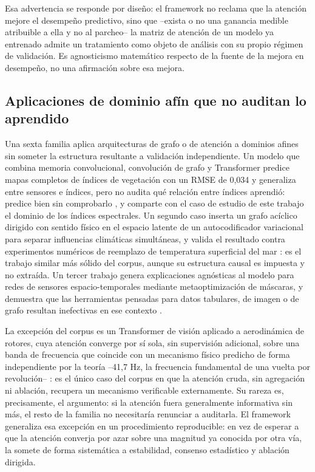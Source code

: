 Esa advertencia se responde por diseño: el framework no reclama que la atención mejore el desempeño predictivo, sino que --exista o no una ganancia medible atribuible a ella y no al parcheo-- la matriz de atención de un modelo ya entrenado admite un tratamiento como objeto de análisis con su propio régimen de validación. Es agnosticismo matemático respecto de la fuente de la mejora en desempeño, no una afirmación sobre esa mejora.

\subsection{Aplicaciones de dominio afín que no auditan lo aprendido}

Una sexta familia aplica arquitecturas de grafo o de atención a dominios afines sin someter la estructura resultante a validación independiente. Un modelo que combina memoria convolucional, convolución de grafo y Transformer predice mapas completos de índices de vegetación con un RMSE de 0,034 y generaliza entre sensores e índices, pero no audita qué relación entre índices aprendió: predice bien sin comprobarlo \cite{convlstmgcn2026vegetation}, y comparte con el caso de estudio de este trabajo el dominio de los índices espectrales. Un segundo caso inserta un grafo acíclico dirigido con sentido físico en el espacio latente de un autocodificador variacional para separar influencias climáticas simultáneas, y valida el resultado contra experimentos numéricos de reemplazo de temperatura superficial del mar \cite{teleconnections2026causal}: es el trabajo similar más sólido del corpus, aunque su estructura causal es impuesta y no extraída. Un tercer trabajo genera explicaciones agnósticas al modelo para redes de sensores espacio-temporales mediante metaoptimización de máscaras, y demuestra que las herramientas pensadas para datos tabulares, de imagen o de grafo resultan inefectivas en ese contexto \cite{spatiotemporal2024e2e}.

La excepción del corpus es un Transformer de visión aplicado a aerodinámica de rotores, cuya atención converge por sí sola, sin supervisión adicional, sobre una banda de frecuencia que coincide con un mecanismo físico predicho de forma independiente por la teoría --41,7 Hz, la frecuencia fundamental de una vuelta por revolución-- \cite{rotorcraft2026vortexring}: es el único caso del corpus en que la atención cruda, sin agregación ni ablación, recupera un mecanismo verificable externamente. Su rareza es, precisamente, el argumento: si la atención fuera generalmente informativa sin más, el resto de la familia no necesitaría renunciar a auditarla. El framework generaliza esa excepción en un procedimiento reproducible: en vez de esperar a que la atención converja por azar sobre una magnitud ya conocida por otra vía, la somete de forma sistemática a estabilidad, consenso estadístico y ablación dirigida.

